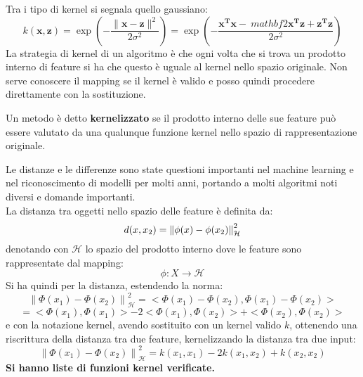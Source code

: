 Tra i tipo di kernel si segnala quello gaussiano:
\[ k(\mathbf{x}, \mathbf{z}) =\exp \left(-\frac{\|\mathbf{x}-
      \mathbf{z}\|^{2}}{2 \sigma^{2}}\right) 
  =\exp \left(-\frac{\mathbf{x}^{\mathbf{T}} \mathbf{x}-\
      mathbf{2} \mathbf{x}^{\mathbf{T}} \mathbf{z}+
      \mathbf{z}^{\mathbf{T}} \mathbf{z}}{2 \sigma^{2}}\right)\]
La strategia di kernel di un algoritmo è che ogni volta che si trova un prodotto
interno di feature si ha che questo è uguale al kernel nello spazio
originale. Non serve conoscere il mapping se il kernel è valido e posso quindi
procedere direttamente con la sostituzione.
\begin{definizione}
  Un metodo è detto \textbf{kernelizzato} se il prodotto interno delle sue
  feature può essere valutato da una qualunque funzione kernel nello spazio di
  rappresentazione originale.
\end{definizione}
Le distanze e le differenze sono state questioni importanti nel machine
learning e nel riconoscimento di modelli per molti anni, portando a molti
algoritmi noti diversi e domande importanti.\\
La distanza tra oggetti nello spazio delle feature è definita da:
\[d(x,x_2)=\norm{\phi(x)-\phi(x_2)}^2_{\mathcal{H}}\]
denotando con $\mathcal{H}$ lo spazio del prodotto interno dove le feature sono
rappresentate dal mapping:
\[\phi:X\to \mathcal{H}\]
Si ha quindi per la distanza, estendendo la norma:
\[
  \left\|\Phi\left(x_{1}\right)-\Phi\left(x_{2}\right)\right\|_{\mathcal{H}}^{2}
  =<\Phi\left(x_{1}\right)-\Phi\left(x_{2}\right),
    \Phi\left(x_{1}\right)-\Phi\left(x_{2}\right)>\]
    \[
  =<\Phi\left(x_{1}\right), \Phi\left(x_{1}\right)>-2<\Phi
  \left(x_{1}\right), \Phi\left(x_{2}\right)>+<\Phi\left(x_{2}\right),
  \Phi\left(x_{2}\right)>
\]
e con la notazione kernel, avendo sostituito con un kernel valido $k$, ottenendo
una riscrittura della distanza tra due feature, kernelizzando la distanza tra
due input:
\[\left\|\Phi\left(x_{1}\right)-\Phi\left(x_{2}\right)\right\|_{\mathcal{H}}^{2}
  =k(x_1,x_1)-2k(x_1,x_2)+k(x_2,x_2)\]
\textbf{Si hanno liste di funzioni kernel verificate.}